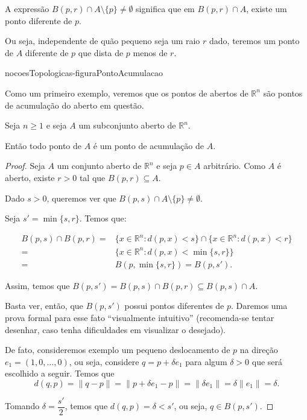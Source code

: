 A expressão $B(p, r)\cap A\setminus\{p\}\neq\emptyset$ significa que em $B(p, r)\cap A$, existe um ponto diferente de $p$.

Ou seja, independente de quão pequeno seja um raio $r$ dado, teremos um ponto de $A$ diferente de $p$ que dista de $p$ menos de $r$.

{nocoesTopologicas-figuraPontoAcumulacao}


Como um primeiro exemplo, veremos que os pontos de abertos de $\mathbb R^n$ são pontos de acumulação do aberto em questão.

\begin{proposition}\label{prop:abertosPontosAcumulacao}
    Seja $n\geq 1$ e seja $A$ um subconjunto aberto de $\mathbb R^n$.

    Então todo ponto de $A$ é um ponto de acumulação de $A$.
\end{proposition}
\begin{proof}
    Seja $A$ um conjunto aberto de $\mathbb R^n$ e seja $p \in A$ arbitrário.
    Como $A$ é aberto, existe $r>0$ tal que $B(p, r)\subseteq A$.

    Dado $s>0$, queremos ver que $B(p, s)\cap A\setminus\{p\}\neq \emptyset$.

    Seja $s'=\min\{s, r\}$.
    Temos que:

    \begin{align*}
        B(p, s)\cap B(p, r)=&\{x \in \mathbb R^n : d(p, x) < s\} \cap \{x \in \mathbb R^n : d(p, x) < r\} \\=& \{x \in \mathbb R^n : d(p, x) < \min\{s, r\}\}\\=& B(p, \min\{s, r\})=B(p, s').
    \end{align*}

    Assim, temos que $B(p, s')=B(p, s)\cap B(p, r)\subseteq B(p, s)\cap A$.

    Basta ver, então, que $B(p, s')$ possui pontos diferentes de $p$.
    Daremos uma prova formal para esse fato ``visualmente intuitivo'' (recomenda-se tentar desenhar, caso tenha dificuldades em visualizar o desejado).

    De fato, consideremos exemplo um pequeno deslocamento de $p$ na direção $e_1=(1, 0, \dots, 0)$, ou seja, considere $q=p+\delta e_1$ para algum $\delta > 0$ que será escolhido a seguir. Temos que
    \[
    d(q, p) = \|q-p\| = \|p+\delta e_1 - p\| = \|\delta e_1\| = \delta\|e_1\| = \delta.
    \]

    Tomando $\delta=\dfrac{s'}{2}$, temos que $d(q, p) = \delta < s'$, ou seja, $q \in B(p, s')$.
\end{proof}

